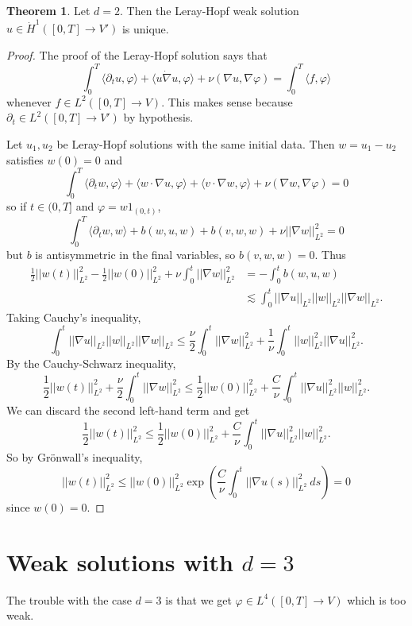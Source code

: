 \documentclass[12pt]{book}
\theoremstyle{definition}
\newtheorem{theorem}{Theorem}[chapter]
\begin{document}
\begin{theorem}
Let $d = 2$.
Then the Leray-Hopf weak solution $u \in \dot H^1([0, T] \to V')$ is unique.
\end{theorem}
\begin{proof}
The proof of the Leray-Hopf solution says that
$$\int_0^T \langle \partial_t u, \varphi\rangle + \langle u \dot \nabla u, \varphi\rangle + \nu(\nabla u, \nabla \varphi) = \int_0^T \langle f, \varphi\rangle$$
whenever $f \in L^2([0, T] \to V)$.
This makes sense because $\partial_t \in L^2([0, T] \to V')$ by hypothesis.

Let $u_1, u_2$ be Leray-Hopf solutions with the same initial data. Then $w = u_1 - u_2$ satisfies $w(0) = 0$ and
$$\int_0^T \langle \partial_t w, \varphi\rangle + \langle w \cdot \nabla u, \varphi\rangle + \langle v \cdot \nabla w, \varphi\rangle + \nu(\nabla w, \nabla \varphi) = 0$$
so if $t \in (0, T]$ and $\varphi = w1_{(0, t)}$,
$$\int_0^T \langle \partial_t w, w\rangle + b(w, u, w) + b(v, w, w) + \nu||\nabla w||_{L^2}^2 = 0$$
but $b$ is antisymmetric in the final variables, so $b(v, w, w) = 0$.
Thus
\begin{align*}
\frac{1}{2}||w(t)||_{L^2}^2 - \frac{1}{2} ||w(0)||_{L^2}^2 + \nu\int_0^t ||\nabla w||_{L^2}^2 &= -\int_0^t b(w, u, w)\\
&\lesssim \int_0^t ||\nabla u||_{L^2} ||w||_{L^2} ||\nabla w||_{L^2}.
\end{align*}
Taking Cauchy's inequality,
$$\int_0^t ||\nabla u||_{L^2} ||w||_{L^2} ||\nabla w||_{L^2} \leq \frac{\nu}{2} \int_0^t ||\nabla w||_{L^2}^2 + \frac{1}{\nu} \int_0^t ||w||_{L^2}^2 ||\nabla u||_{L^2}^2.$$
By the Cauchy-Schwarz inequality,
$$\frac{1}{2}||w(t)||_{L^2}^2 + \frac{\nu}{2} \int_0^t ||\nabla w||_{L^2}^2 \leq \frac{1}{2} ||w(0)||_{L^2}^2 + \frac{C}{\nu} \int_0^t ||\nabla u||_{L^2}^2 ||w||_{L^2}^2.$$
We can discard the second left-hand term and get
$$\frac{1}{2}||w(t)||_{L^2}^2 \leq \frac{1}{2} ||w(0)||_{L^2}^2 + \frac{C}{\nu} \int_0^t ||\nabla u||_{L^2}^2 ||w||_{L^2}^2.$$
So by Gr\"onwall's inequality,
$$||w(t)||_{L^2}^2 \leq ||w(0)||_{L^2}^2 \exp\left(\frac{C}{\nu} \int_0^t ||\nabla u(s)||_{L^2}^2 ~ds\right) = 0$$
since $w(0) = 0$.
\end{proof}

\section{Weak solutions with $d = 3$}
The trouble with the case $d = 3$ is that we get $\varphi \in L^4([0, T] \to V)$ which is too weak.
\end{document}
